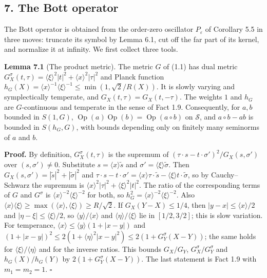 \documentclass[
  11pt,
]{article}
\begin{document}
\subsection{7. The Bott operator}\label{the-bott-operator}

The Bott operator is obtained from the order-zero oscillator
\(P_\varepsilon\) of Corollary 5.5 in three moves: truncate its symbol
by Lemma 6.1, cut off the far part of its kernel, and normalize it at
infinity. We first collect three tools.

\textbf{Lemma 7.1} (The product metric). The metric \(G\) of (1.1) has
dual metric
\(G^\sigma_X(t,\tau)=\langle\xi\rangle^2|t|^2+\langle x\rangle^2|\tau|^2\)
and Planck function
\(h_G(X)=\langle x\rangle^{-1}\langle\xi\rangle^{-1}\le\min(1,\sqrt2/R(X))\).
It is slowly varying and symplectically temperate, and
\(G_X(t,\tau)=G_X(t,-\tau)\). The weights \(1\) and \(h_G\) are
\(G\)-continuous and temperate in the sense of Fact 1.9. Consequently,
for \(a,b\) bounded in \(S(1,G)\),
\(\operatorname{Op}(a)\operatorname{Op}(b)=\operatorname{Op}(a\circ b)\)
on \(\mathcal S\), and \(a\circ b-ab\) is bounded in \(S(h_G,G)\), with
bounds depending only on finitely many seminorms of \(a\) and \(b\).

\textbf{Proof.} By definition, \(G^\sigma_X(t,\tau)\) is the supremum of
\((\tau\cdot s-t\cdot\sigma')^2/G_X(s,\sigma')\) over
\((s,\sigma')\ne0\). Substitute \(s=\langle x\rangle\tilde s\) and
\(\sigma'=\langle\xi\rangle\tilde\sigma\). Then
\(G_X(s,\sigma')=|\tilde s|^2+|\tilde\sigma|^2\) and
\(\tau\cdot s-t\cdot\sigma'=\langle x\rangle\tau\cdot\tilde s-\langle\xi\rangle t\cdot\tilde\sigma\),
so by Cauchy--Schwarz the supremum is
\(\langle x\rangle^2|\tau|^2+\langle\xi\rangle^2|t|^2\). The ratio of
the corresponding terms of \(G\) and \(G^\sigma\) is
\(\langle x\rangle^{-2}\langle\xi\rangle^{-2}\) for both, so
\(h_G^2=\langle x\rangle^{-2}\langle\xi\rangle^{-2}\). Also
\(\langle x\rangle\langle\xi\rangle\ge\max(\langle x\rangle,\langle\xi\rangle)\ge R/\sqrt2\).
If \(G_X(Y-X)\le1/4\), then \(|y-x|\le\langle x\rangle/2\) and
\(|\eta-\xi|\le\langle\xi\rangle/2\), so
\(\langle y\rangle/\langle x\rangle\) and
\(\langle\eta\rangle/\langle\xi\rangle\) lie in \([1/2,3/2]\); this is
slow variation. For temperance,
\(\langle x\rangle\le\langle y\rangle(1+|x-y|)\) and
\((1+|x-y|)^2\le2(1+\langle\eta\rangle^2|x-y|^2)\le2(1+G^\sigma_Y(X-Y))\);
the same holds for \(\langle\xi\rangle/\langle\eta\rangle\) and for the
inverse ratios. This bounds \(G_X/G_Y\), \(G^\sigma_X/G^\sigma_Y\) and
\(h_G(X)/h_G(Y)\) by \(2(1+G^\sigma_Y(X-Y))\). The last statement is
Fact 1.9 with \(m_1=m_2=1\). \(\square\)
\end{document}
